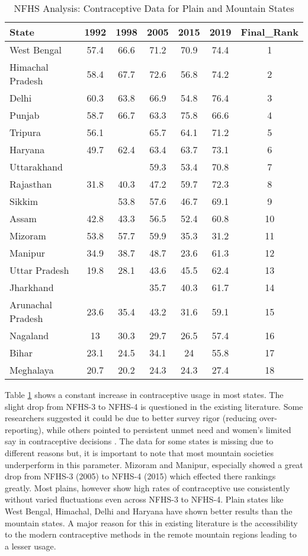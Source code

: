 \begin{table}[h!]
\centering
\caption{NFHS Analysis: Contraceptive Data for Plain and Mountain States}
\begin{tabular}{lcccccc}
\toprule
State & 1992 & 1998 & 2005 & 2015 & 2019 & Final\_Rank \\
\midrule
West Bengal & 57.4 & 66.6 & 71.2 & 70.9 & 74.4 & 1 \\
Himachal Pradesh & 58.4 & 67.7 & 72.6 & 56.8 & 74.2 & 2 \\
Delhi & 60.3 & 63.8 & 66.9 & 54.8 & 76.4 & 3 \\
Punjab & 58.7 & 66.7 & 63.3 & 75.8 & 66.6 & 4 \\
Tripura & 56.1 &  & 65.7 & 64.1 & 71.2 & 5 \\
Haryana & 49.7 & 62.4 & 63.4 & 63.7 & 73.1 & 6 \\
Uttarakhand &  &  & 59.3 & 53.4 & 70.8 & 7 \\
Rajasthan & 31.8 & 40.3 & 47.2 & 59.7 & 72.3 & 8 \\
Sikkim &  & 53.8 & 57.6 & 46.7 & 69.1 & 9 \\
Assam & 42.8 & 43.3 & 56.5 & 52.4 & 60.8 & 10 \\
Mizoram & 53.8 & 57.7 & 59.9 & 35.3 & 31.2 & 11 \\
Manipur & 34.9 & 38.7 & 48.7 & 23.6 & 61.3 & 12 \\
Uttar Pradesh & 19.8 & 28.1 & 43.6 & 45.5 & 62.4 & 13 \\
Jharkhand &  &  & 35.7 & 40.3 & 61.7 & 14 \\
Arunachal Pradesh & 23.6 & 35.4 & 43.2 & 31.6 & 59.1 & 15 \\
Nagaland & 13 & 30.3 & 29.7 & 26.5 & 57.4 & 16 \\
Bihar & 23.1 & 24.5 & 34.1 & 24 & 55.8 & 17 \\
Meghalaya & 20.7 & 20.2 & 24.3 & 24.3 & 27.4 & 18 \\
\bottomrule
\end{tabular}
\label{tab:contraceptive_data}
\end{table}
Table \ref{tab:contraceptive_data} shows a constant increase in contraceptive usage in most states. The slight drop from NFHS-3 to NFHS-4 is questioned in the existing literature. Some researchers suggested it could be due to better survey rigor (reducing over-reporting), while others pointed to persistent unmet need and women’s limited say in contraceptive decisions \citep{kumar2022measuring}. The data for some states is missing due to different reasons but, it is important to note that most mountain societies underperform in this parameter. Mizoram and Manipur, especially showed a great drop from NFHS-3 (2005) to NFHS-4 (2015) which effected there rankings greatly. Most plains, however show high rates of contraceptive use consistently without varied fluctuations even across NFHS-3 to NFHS-4. Plain states like West Bengal, Himachal, Delhi and Haryana have shown better results than the mountain states. A major reason for this in existing literature is  the accessibility to the modern contraceptive methods in the remote mountain regions leading to a lesser usage. 

